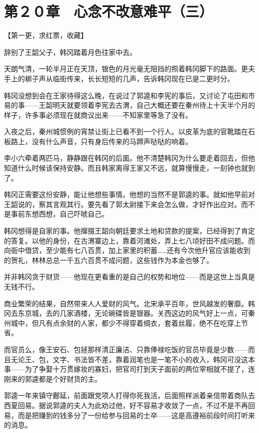 \section{第２０章　心念不改意难平（三） }

【第一更，求红票，收藏】

辞别了王韶父子，韩冈踏着月色往家中去。

天朗气清，一轮半月正在天顶，银色的月光毫无阻挡的照着韩冈脚下的路面。更夫手上的梆子声从临街传来，长长短短的几声，告诉韩冈现在已是二更时分。

韩冈没想到会在王家待得这么晚，在说过了郭逵和李宪的事后，又讨论了屯田和市易的事——王韶明天就要领着李宪去古渭，自己大概还要在秦州待上十天半个月的样子，许多事必须现在就商议出来——不知家里等急了没有。

入夜之后，秦州城惯例的宵禁让街上已看不到一个行人。以皮革为底的官靴踏在石板路上，没有什么声音，只有身后传来的马蹄声哒哒的响着。

李小六牵着两匹马，静静跟在韩冈的后面。他不清楚韩冈为什么要走着回去，但他知道什么时候该保持安静。而且韩家离得王家又不远，就算慢慢走，一刻钟也就到了。

韩冈正需要这份安静，能让他想些事情。他想的当然不是郭逵的事。就如他早前对王韶说的，察其言观其行。要先看了郭太尉接下来会怎么做，才好作出应对。而不是事前东想西想，自己吓唬自己。

韩冈想得是自家的事。他撺掇王韶向朝廷要求土地和贷款的提案，已经得到了肯定的答复。以他的身份，在古渭寨边上，靠着河滩处，弄上七八顷好田不成问题。而向衙中借贷，至少能有七八百贯，加上家里的积蓄……还有今次他升官应该能收到的贺礼，林林总总一千五六百贯不成问题，这些钱作为本金也够了。

并非韩冈贪于财货——他现在更看重的是自己的权势和地位——而是这世上当真是无钱不行。

商业繁荣的结果，自然带来人人爱财的风气。北宋承平百年，世风越发的奢靡。韩冈去东京城，去的几家酒楼，无论碗碟皆是银器。关西这边的风气好上一点，可秦州城中，但凡有点余财的人家，都少不得穿着绸衣，套着丝履，绝不在吃穿上节省。

而官员么，像王安石、包拯那样清正廉洁、只靠俸禄吃饭的官员毕竟是少数——而且无论王、包，文字、书法皆不差，靠着润笔也是一笔不小的收入，韩冈可没这本事——为了争娶十万贯嫁妆的寡妇，把官司打到天子面前的两位宰相就不提了，连刚来的郭逵都是个好财货的主。

郭逵一年来镇守鄜延，前面跟党项人打得你死我活，后面照样派着亲信带着商队去西夏回易。据说郭逵的夫人为此劝过他，好不容易才收敛了一点，不过不是不再回易，而是把赚到的钱多分了一份给参与回易的士卒——这是高遵裕前段时间打听来的消息。

